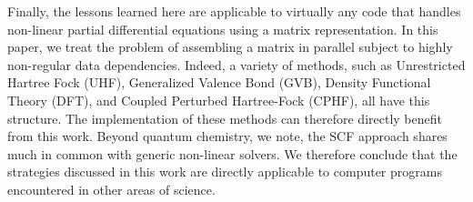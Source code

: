 Finally, the lessons learned here are applicable to virtually any code that handles non-linear partial differential equations using a matrix representation. In this paper, we treat the problem of assembling a matrix in parallel subject to highly non-regular data dependencies. Indeed, a variety of methods, such as Unrestricted Hartree Fock (UHF), Generalized Valence Bond (GVB), Density Functional Theory (DFT), and Coupled Perturbed Hartree-Fock (CPHF), all have this structure. The implementation of these methods can therefore directly benefit from this work. Beyond quantum chemistry, we note, the SCF approach shares much in common  with generic non-linear solvers. We therefore conclude that the strategies discussed in this work are directly applicable to computer programs encountered in other areas of science.